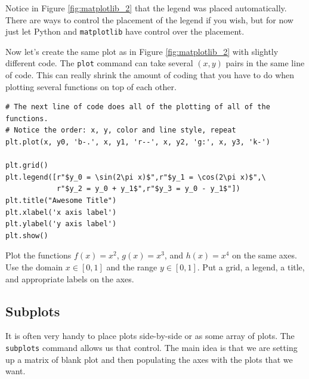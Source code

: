 Notice in Figure \ref{fig:matplotlib_2} that the legend was placed automatically.  There
are ways to control the placement of the legend if you wish, but for now just let Python
and \texttt{matplotlib} have control over the placement.

\begin{example}
    Now let's create the same plot as in Figure \ref{fig:matplotlib_2} with slightly different code.  The \texttt{plot}
    command can take several $(x, y)$ pairs in the same line of code.  This can really
    shrink the amount of coding that you have to do when plotting several functions on top
    of each other.

\bcode
\begin{lstlisting}
# The next line of code does all of the plotting of all of the functions.
# Notice the order: x, y, color and line style, repeat
plt.plot(x, y0, 'b-.', x, y1, 'r--', x, y2, 'g:', x, y3, 'k-')

plt.grid()
plt.legend([r"$y_0 = \sin(2\pi x)$",r"$y_1 = \cos(2\pi x)$",\
            r"$y_2 = y_0 + y_1$",r"$y_3 = y_0 - y_1$"])
plt.title("Awesome Title")
plt.xlabel('x axis label')
plt.ylabel('y axis label')
plt.show()
\end{lstlisting}
    
\end{example}


\begin{problem}
    Plot the functions $f(x) = x^2$, $g(x) = x^3$, and $h(x) = x^4$ on the same axes.  Use the domain $x \in [0,1]$ and the range $y \in [0,1]$.  Put a grid, a legend, a title, and appropriate labels on the axes.
\end{problem}


\subsection{Subplots}
It is often very handy to place plots side-by-side or as some array of plots.  The
\texttt{subplots} command allows us that control.  The main idea is that we are setting up
a matrix of blank plot and then populating the axes with the plots that we want.

